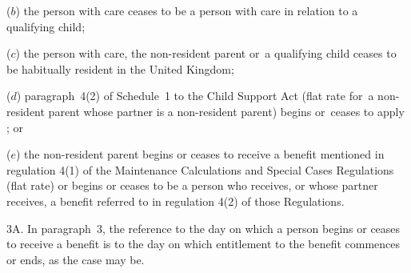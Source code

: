 \documentclass[12pt,a4paper]{article}
\begin{document}
{\begin{enumerate}
($b$) the person with care ceases to be a person with care in relation to a qualifying child;

($c$) the person with care, the non-resident parent or~a qualifying child ceases to be habitually resident in the United Kingdom; 

($d$) paragraph~4(2) of Schedule~1 to the Child Support Act (flat rate for~a non-resident parent whose partner is a non-resident parent) begins or~ceases to apply%
%
; or

($e$) the non-resident parent begins or ceases to receive a benefit mentioned in regulation 4(1) of the Maintenance Calculations and Special Cases Regulations (flat rate) or begins or ceases to be a person who receives, or whose partner receives, a benefit referred to in regulation 4(2) of those Regulations.
\end{enumerate}


\medskip

3A.  In paragraph~3, the reference to the day on which a person begins or ceases to receive a benefit is to the day on which entitlement to the benefit commences or ends, as the case may be.


%

}
\end{document}

